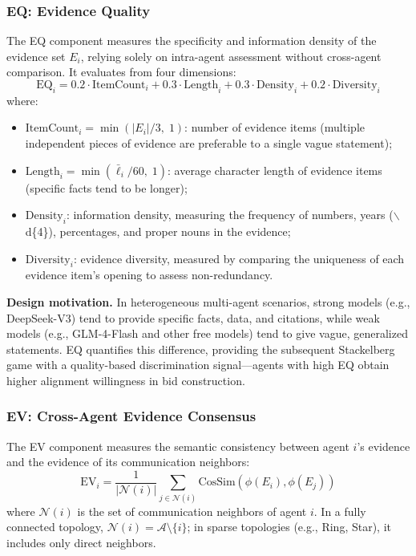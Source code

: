 \documentclass[12pt,a4paper]{article}
\begin{document}
\subsubsection{EQ: Evidence Quality}

The EQ component measures the specificity and information density of the evidence set $E_i$, relying solely on intra-agent assessment without cross-agent comparison. It evaluates from four dimensions:
\begin{equation}\label{eq:eq}
\text{EQ}_i = 0.2 \cdot \text{ItemCount}_i + 0.3 \cdot \text{Length}_i + 0.3 \cdot \text{Density}_i + 0.2 \cdot \text{Diversity}_i
\end{equation}
where:
\begin{itemize}[nosep]
    \item $\text{ItemCount}_i = \min(|E_i| / 3,\; 1)$: number of evidence items (multiple independent pieces of evidence are preferable to a single vague statement);
    \item $\text{Length}_i = \min(\bar{\ell}_i / 60,\; 1)$: average character length of evidence items (specific facts tend to be longer);
    \item $\text{Density}_i$: information density, measuring the frequency of numbers, years ($\backslash$d\{4\}), percentages, and proper nouns in the evidence;
    \item $\text{Diversity}_i$: evidence diversity, measured by comparing the uniqueness of each evidence item's opening to assess non-redundancy.
\end{itemize}

\textbf{Design motivation.} In heterogeneous multi-agent scenarios, strong models (e.g., DeepSeek-V3) tend to provide specific facts, data, and citations, while weak models (e.g., GLM-4-Flash and other free models) tend to give vague, generalized statements. EQ quantifies this difference, providing the subsequent Stackelberg game with a quality-based discrimination signal---agents with high EQ obtain higher alignment willingness in bid construction.

\subsubsection{EV: Cross-Agent Evidence Consensus}

The EV component measures the semantic consistency between agent $i$'s evidence and the evidence of its communication neighbors:
\begin{equation}\label{eq:ev}
\text{EV}_i = \frac{1}{|\mathcal{N}(i)|} \sum_{j \in \mathcal{N}(i)} \text{CosSim}(\phi(E_i), \phi(E_j))
\end{equation}
where $\mathcal{N}(i)$ is the set of communication neighbors of agent $i$. In a fully connected topology, $\mathcal{N}(i) = \mathcal{A} \setminus \{i\}$; in sparse topologies (e.g., Ring, Star), it includes only direct neighbors.
\end{document}
